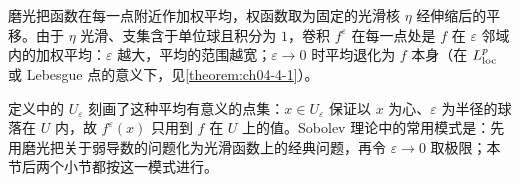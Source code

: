 \documentclass[../../main.tex]{subfiles}%
\begin{document}
\begin{remark}\label{remark:ch04-def-4-2-记号-动机}
磨光把函数在每一点附近作加权平均，权函数取为固定的光滑核 $\eta$ 经伸缩后的平移。由于 $\eta$ 光滑、支集含于单位球且积分为 $1$，卷积 $f^\varepsilon$ 在每一点处是 $f$ 在 $\varepsilon$ 邻域内的加权平均：$\varepsilon$ 越大，平均的范围越宽；$\varepsilon\to0$ 时平均退化为 $f$ 本身（在 $L^p_{\mathrm{loc}}$ 或 Lebesgue 点的意义下，见\cref{theorem:ch04-4-1}）。%

定义中的 $U_\varepsilon$ 刻画了这种平均有意义的点集：$x\in U_\varepsilon$ 保证以 $x$ 为心、$\varepsilon$ 为半径的球落在 $U$ 内，故 $f^\varepsilon(x)$ 只用到 $f$ 在 $U$ 上的值。Sobolev 理论中的常用模式是：先用磨光把关于弱导数的问题化为光滑函数上的经典问题，再令 $\varepsilon\to0$ 取极限；本节后两个小节都按这一模式进行。
\end{remark}
\end{document}

